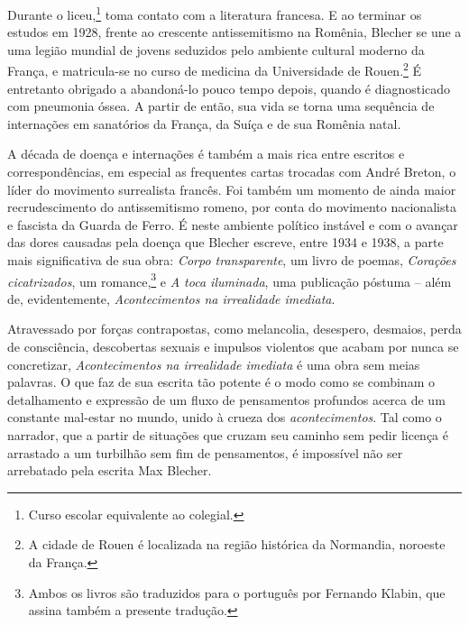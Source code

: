 Durante o liceu,\footnote{Curso escolar equivalente ao colegial.} toma contato com a literatura francesa. E ao terminar os estudos em 1928, frente ao crescente antissemitismo na Romênia, Blecher se une a uma legião mundial de jovens seduzidos pelo ambiente cultural moderno da França, e matricula-se no curso de medicina da Universidade de Rouen.\footnote{A cidade de Rouen é localizada na região histórica da Normandia, noroeste da França.} É entretanto obrigado a abandoná-lo pouco tempo depois, quando é diagnosticado com pneumonia óssea. A partir de então, sua vida se torna uma sequência de internações em sanatórios da França, da Suíça e de sua Romênia natal.
	
A década de doença e internações é também a mais rica entre escritos e correspondências, em especial as frequentes cartas trocadas com André Breton, o líder do movimento surrealista francês. Foi também um momento de ainda maior recrudescimento do antissemitismo romeno, por conta do movimento nacionalista e fascista da Guarda de Ferro. É neste ambiente político instável e com o avançar das dores causadas pela doença que Blecher escreve, entre 1934 e 1938, a parte mais significativa de sua obra: \textit{Corpo transparente}, um livro de poemas, \textit{Corações cicatrizados}, um romance,\footnote{Ambos os livros são traduzidos para o português por Fernando Klabin, que assina também a presente tradução.} e \textit{A toca iluminada}, uma publicação póstuma -- além de, evidentemente, \textit{Acontecimentos na irrealidade imediata}.

Atravessado por forças contrapostas, como melancolia, desespero, desmaios, perda de consciência, descobertas sexuais e impulsos violentos que acabam por nunca se concretizar, \textit{Acontecimentos na irrealidade imediata} é uma obra sem meias palavras. O que faz de sua escrita tão potente é o modo como se combinam o detalhamento e expressão de um fluxo de pensamentos profundos acerca de um constante mal-estar no mundo, unido à crueza dos \textit{acontecimentos}. Tal como o narrador, que a partir de situações que cruzam seu caminho sem pedir licença é arrastado a um turbilhão sem fim de pensamentos, é impossível não ser arrebatado pela escrita Max Blecher.